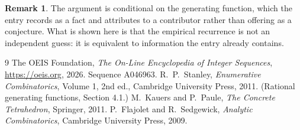 \documentclass[11pt,a4paper]{article}
\theoremstyle{plain}
\theoremstyle{definition}
\newtheorem{remark}[theorem]{Remark}
\begin{document}
\begin{remark}
The argument is conditional on the generating function, which the entry records as a fact and
attributes to a contributor rather than offering as a conjecture. What is shown here is that
the empirical recurrence is not an independent guess: it is equivalent to information the
entry already contains.
\end{remark}

\begin{thebibliography}{9}
 The OEIS Foundation, \emph{The On-Line Encyclopedia of Integer
Sequences}, \url{https://oeis.org}, 2026. Sequence A046963.
 R.~P.~Stanley, \emph{Enumerative Combinatorics}, Volume 1, 2nd ed.,
Cambridge University Press, 2011. (Rational generating functions, Section 4.1.)
 M.~Kauers and P.~Paule, \emph{The Concrete Tetrahedron}, Springer, 2011.
 P.~Flajolet and R.~Sedgewick, \emph{Analytic Combinatorics}, Cambridge
University Press, 2009.
\end{thebibliography}
\end{document}
